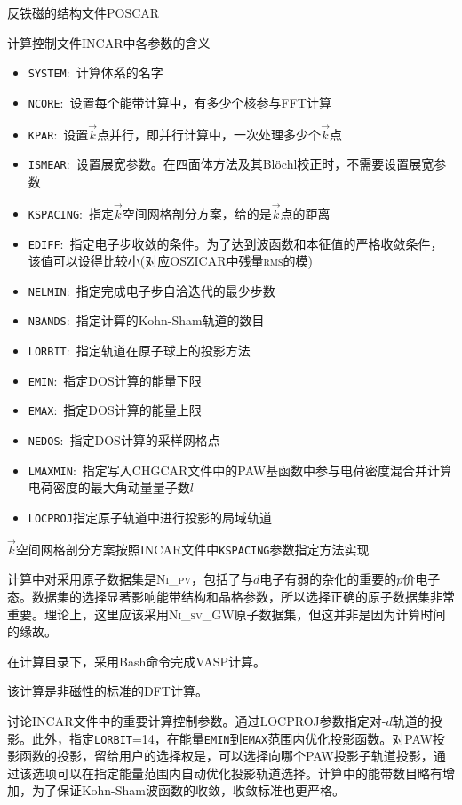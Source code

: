 反铁磁的结构文件\textrm{POSCAR}

计算控制文件\textrm{INCAR}中各参数的含义
\begin{itemize}
	\item \texttt{SYSTEM}:~计算体系的名字
	\item \texttt{NCORE}:~设置每个能带计算中，有多少个核参与\textrm{FFT}计算
	\item \texttt{KPAR}:~设置$\vec k$点并行，即并行计算中，一次处理多少个$\vec k$点
	\item \texttt{ISMEAR}:~设置展宽参数。在四面体方法及其\textrm{Bl\"ochl}校正时，不需要设置展宽参数
	\item \texttt{KSPACING}:~指定$\vec k$空间网格剖分方案，给的是$\vec k$点的距离
	\item \texttt{EDIFF}:~指定电子步收敛的条件。为了达到波函数和本征值的严格收敛条件，该值可以设得比较小(对应\textrm{OSZICAR}中残量\textsc{rms}的模)
	\item \texttt{NELMIN}:~指定完成电子步自洽迭代的最少步数
	\item \texttt{NBANDS}:~指定计算的\textrm{Kohn-Sham}轨道的数目
	\item \texttt{LORBIT}:~指定轨道在原子球上的投影方法
	\item \texttt{EMIN}:~指定\textrm{DOS}计算的能量下限
	\item \texttt{EMAX}:~指定\textrm{DOS}计算的能量上限
	\item \texttt{NEDOS}:~指定\textrm{DOS}计算的采样网格点
	\item \texttt{LMAXMIN}:~指定写入\textrm{CHGCAR}文件中的\textrm{PAW}基函数中参与电荷密度混合并计算电荷密度的最大角动量量子数$l$
	\item \texttt{LOCPROJ}指定原子轨道中进行投影的局域轨道
\end{itemize}

$\vec k$空间网格剖分方案按照\textrm{INCAR}文件中\texttt{KSPACING}参数指定方法实现

计算中对采用原子数据集是\textsc{Ni\_pv}，包括了与$d$电子有弱的杂化的重要的$p$价电子态。数据集的选择显著影响能带结构和晶格参数，所以选择正确的原子数据集非常重要。理论上，这里应该采用\textsc{Ni\_sv\_GW}原子数据集，但这并非是因为计算时间的缘故。

在计算目录下，采用\textrm{Bash}命令完成\textrm{VASP}计算。

该计算是非磁性的标准的\textrm{DFT}计算。

讨论\textrm{INCAR}文件中的重要计算控制参数。通过\textsc{LOCPROJ}参数指定对-$d$轨道的投影。此外，指定\texttt{LORBIT}=14，在能量\texttt{EMIN}到\texttt{EMAX}范围内优化投影函数。对\textrm{PAW}投影函数的投影，留给用户的选择权是，可以选择向哪个\textrm{PAW}投影子轨道投影，通过该选项可以在指定能量范围内自动优化投影轨道选择。计算中的能带数目略有增加，为了保证\textrm{Kohn-Sham}波函数的收敛，收敛标准也更严格。

